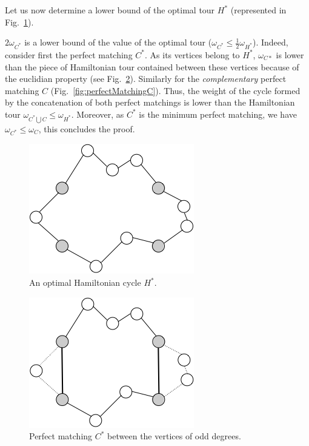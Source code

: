 {Let us now determine a lower bound of the optimal tour $H^*$ (represented in Fig.~\ref{fig:perfectMatchingInitial}).

$2 \omega_{C^*}$ is a lower bound of the value of the optimal tour ($\omega_{C^*} \leq \frac{1}{2} \omega_{H^*}$). 
Indeed, consider first the perfect matching $C^*$.
As its vertices belong to $H^*$, $\omega_{C*}$ is lower than the piece of Hamiltonian tour contained between these vertices
because of the euclidian property (see Fig.~\ref{fig:perfectMatchingC*}).
Similarly for the \textit{complementary} perfect matching $C$ (Fig.~\ref{fig:perfectMatchingC}).  
Thus, the weight of the cycle formed by the concatenation of both perfect matchings is lower than the Hamiltonian tour $\omega_{C^* \bigcup C} \leq \omega_{H^*}$.
Moreover, as $C^*$ is the minimum perfect matching, we have $\omega_{C^*} \leq \omega_{C}$, this concludes the proof.


\begin{figure}[hbt]
\begin{center}
       \includegraphics[scale=0.7]{FiguresGraph/perfectmatching1}
       \caption{An optimal Hamiltonian cycle $H^*$.}
              \label{fig:perfectMatchingInitial}
\end{center}
\end{figure}

\begin{figure}[hbt]
\begin{center}
       \includegraphics[scale=0.7]{FiguresGraph/perfectmatching2}
       \caption{Perfect matching $C^*$ between the vertices of odd degrees.}
              \label{fig:perfectMatchingC*}
\end{center}
\end{figure}

}
